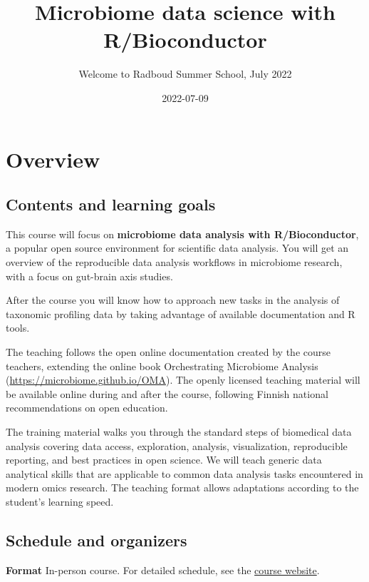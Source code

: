 \documentclass[
  oneside]{book}
\title{Microbiome data science with R/Bioconductor}
\subtitle{Welcome to Radboud Summer School, July 2022}
\author{}
\date{\vspace{-2.5em}2022-07-09}
\begin{document}
\maketitle

{
\setcounter{tocdepth}{1}
\tableofcontents
}
\hypertarget{overview}{%
\chapter{Overview}\label{overview}}

\hypertarget{contents-and-learning-goals}{%
\section{Contents and learning goals}\label{contents-and-learning-goals}}

This course will focus on \textbf{microbiome data analysis
with R/Bioconductor}, a popular open source environment for
scientific data analysis. You will get an overview of the
reproducible data analysis workflows in microbiome research, with a
focus on gut-brain axis studies.

After the course you will know how to approach new tasks in the
analysis of taxonomic profiling data by taking advantage of available
documentation and R tools.

The teaching follows the open online documentation created by the
course teachers, extending the online book Orchestrating Microbiome
Analysis (\url{https://microbiome.github.io/OMA}). The openly licensed
teaching material will be available online during and after the
course, following Finnish national recommendations on open education.

The training material walks you through the standard steps of
biomedical data analysis covering data access, exploration, analysis,
visualization, reproducible reporting, and best practices in open
science. We will teach generic data analytical skills that are
applicable to common data analysis tasks encountered in modern omics
research. The teaching format allows adaptations according to the
student's learning speed.

\hypertarget{schedule-and-organizers}{%
\section{Schedule and organizers}\label{schedule-and-organizers}}

\textbf{Format} In-person course. For detailed schedule, see the
\href{https://www.ru.nl/radboudsummerschool/courses/2022/registration-longer-possible-brain-bacteria}{course
website}.
\end{document}
